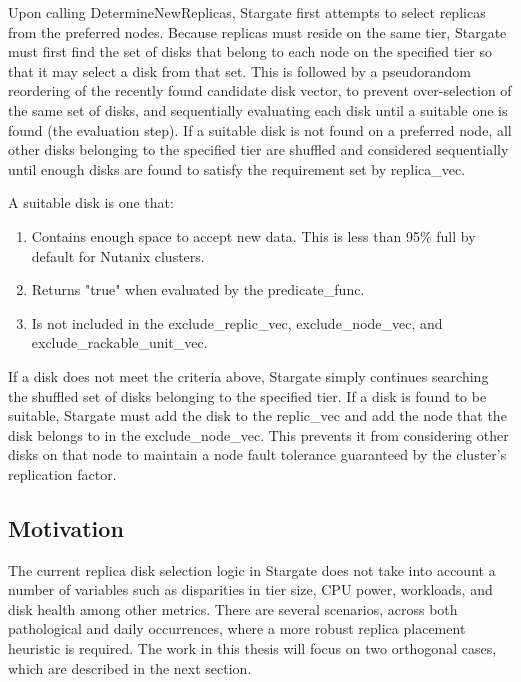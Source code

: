 \documentclass[12pt]{article}
\begin{document}
    Upon calling DetermineNewReplicas, Stargate first attempts to select
    replicas from the preferred nodes. Because replicas must reside on the same
    tier, Stargate must first find the set of disks that belong to each node on
    the specified tier so that it may select a disk from that set. This is
    followed by a pseudorandom reordering of the recently found candidate disk
    vector, to prevent over-selection of the same set of disks, and
    sequentially evaluating each disk until a suitable one is found (the
    evaluation step). If a suitable disk is not found on a preferred node, all
    other disks belonging to the specified tier are shuffled and considered
    sequentially until enough disks are found to satisfy the requirement set by
    replica\_vec.

    A suitable disk is one that:


    \begin{tcolorbox}
    \begin{enumerate}
      \item Contains enough space to accept new data. This is less than 95\%
            full by
            default for Nutanix clusters.  \item Returns "true" when evaluated by the
            predicate\_func.
      \item Is not included in the exclude\_replic\_vec, exclude\_node\_vec,
            and exclude\_rackable\_unit\_vec.
    \end{enumerate}
    \end{tcolorbox}
    \FloatBarrier

    If a disk does not meet the criteria above, Stargate simply continues searching
    the shuffled set of disks belonging to the specified tier. If a disk is
    found to be suitable, Stargate must add the disk to the replic\_vec and add
    the node that the disk belongs to in the exclude\_node\_vec. This prevents
    it from considering other disks on that node to maintain a node fault
    tolerance guaranteed by the cluster's replication factor.

  \subsection{Motivation}

  The current replica disk selection logic in Stargate does not take into
  account a number of variables such as disparities in tier size, CPU power,
  workloads, and disk health among other metrics. There are several scenarios,
  across both pathological and daily occurrences, where a more robust replica
  placement heuristic is required. The work in this thesis will focus on two
  orthogonal cases, which are described in the next section.
\end{document}
